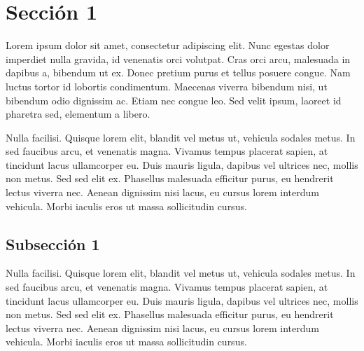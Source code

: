 \documentclass[conference, onecolumn]{IEEEtran}
\begin{document}
\section{Sección 1 }
%
Lorem ipsum dolor sit amet, consectetur adipiscing elit. Nunc egestas dolor imperdiet nulla gravida, id venenatis orci volutpat. Cras orci arcu, malesuada in dapibus a, bibendum ut ex. Donec pretium purus et tellus posuere congue. Nam luctus tortor id lobortis condimentum. Maecenas viverra bibendum nisi, ut bibendum odio dignissim ac. Etiam nec congue leo. Sed velit ipsum, laoreet id pharetra sed, elementum a libero.

Nulla facilisi. Quisque lorem elit, blandit vel metus ut, vehicula sodales metus. In sed faucibus arcu, et venenatis magna. Vivamus tempus placerat sapien, at tincidunt lacus ullamcorper eu. Duis mauris ligula, dapibus vel ultrices nec, mollis non metus. Sed sed elit ex. Phasellus malesuada efficitur purus, eu hendrerit lectus viverra nec. Aenean dignissim nisi lacus, eu cursus lorem interdum vehicula. Morbi iaculis eros ut massa sollicitudin cursus.
%
\subsection{Subsección 1}
%
Nulla facilisi. Quisque lorem elit, blandit vel metus ut, vehicula sodales metus. In sed faucibus arcu, et venenatis magna. Vivamus tempus placerat sapien, at tincidunt lacus ullamcorper eu. Duis mauris ligula, dapibus vel ultrices nec, mollis non metus. Sed sed elit ex. Phasellus malesuada efficitur purus, eu hendrerit lectus viverra nec. Aenean dignissim nisi lacus, eu cursus lorem interdum vehicula. Morbi iaculis eros ut massa sollicitudin cursus.
%
%
\end{document}

